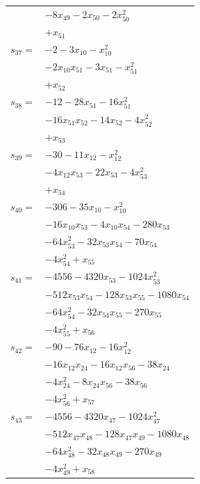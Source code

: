 \begin{longtable}{@{}r@{\;}l@{}}
 & \(\displaystyle -8x_{49} -2x_{50} -2x_{50}^{2}\) \\
 & \(\displaystyle +x_{51}\) \\[3pt]
\(s_{37}=\) & \(\displaystyle -2 -3x_{10} -x_{10}^{2}\) \\
 & \(\displaystyle -2x_{10}x_{51} -3x_{51} -x_{51}^{2}\) \\
 & \(\displaystyle +x_{52}\) \\[3pt]
\(s_{38}=\) & \(\displaystyle -12 -28x_{51} -16x_{51}^{2}\) \\
 & \(\displaystyle -16x_{51}x_{52} -14x_{52} -4x_{52}^{2}\) \\
 & \(\displaystyle +x_{53}\) \\[3pt]
\(s_{39}=\) & \(\displaystyle -30 -11x_{12} -x_{12}^{2}\) \\
 & \(\displaystyle -4x_{12}x_{53} -22x_{53} -4x_{53}^{2}\) \\
 & \(\displaystyle +x_{54}\) \\[3pt]
\(s_{40}=\) & \(\displaystyle -306 -35x_{10} -x_{10}^{2}\) \\
 & \(\displaystyle -16x_{10}x_{53} -4x_{10}x_{54} -280x_{53}\) \\
 & \(\displaystyle -64x_{53}^{2} -32x_{53}x_{54} -70x_{54}\) \\
 & \(\displaystyle -4x_{54}^{2} +x_{55}\) \\[3pt]
\(s_{41}=\) & \(\displaystyle -4556 -4320x_{53} -1024x_{53}^{2}\) \\
 & \(\displaystyle -512x_{53}x_{54} -128x_{53}x_{55} -1080x_{54}\) \\
 & \(\displaystyle -64x_{54}^{2} -32x_{54}x_{55} -270x_{55}\) \\
 & \(\displaystyle -4x_{55}^{2} +x_{56}\) \\[3pt]
\(s_{42}=\) & \(\displaystyle -90 -76x_{12} -16x_{12}^{2}\) \\
 & \(\displaystyle -16x_{12}x_{24} -16x_{12}x_{56} -38x_{24}\) \\
 & \(\displaystyle -4x_{24}^{2} -8x_{24}x_{56} -38x_{56}\) \\
 & \(\displaystyle -4x_{56}^{2} +x_{57}\) \\[3pt]
\(s_{43}=\) & \(\displaystyle -4556 -4320x_{47} -1024x_{47}^{2}\) \\
 & \(\displaystyle -512x_{47}x_{48} -128x_{47}x_{49} -1080x_{48}\) \\
 & \(\displaystyle -64x_{48}^{2} -32x_{48}x_{49} -270x_{49}\) \\
 & \(\displaystyle -4x_{49}^{2} +x_{58}\) \\[3pt]

\end{longtable}
